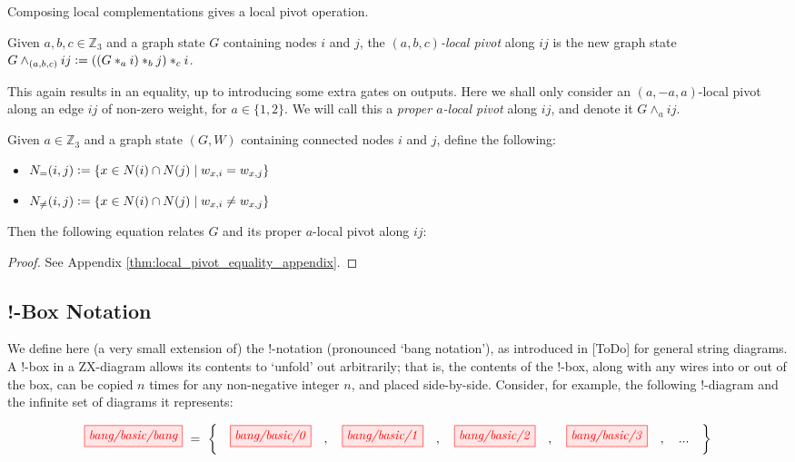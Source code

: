 Composing local complementations gives a local pivot operation.

\begin{definition}\label{def:local_pivot_qutrit}
	Given $a,b,c \in \mathbb{Z}_3$ and a graph state $G$ containing nodes $i$ and $j$, the \textit{$(a,b,c)$-local pivot} along $ij$ is the new graph state $G \wedge_{(a,b,c)} ij \vcentcolon= ((G *_a i) *_b j) *_c i$. 
\end{definition}

This again results in an equality, up to introducing some extra gates on outputs. Here we shall only consider an $(a,-a,a)$-local pivot along an edge $ij$ of non-zero weight, for $a \in \{1, 2\}$. We will call this a \textit{proper $a$-local pivot} along $ij$, and denote it $G \wedge_a ij$.

\begin{theorem}\label{thm:local_pivot_equality}
	Given $a \in \mathbb{Z}_3$ and a graph state $(G, W)$ containing connected nodes $i$ and $j$, define the following:
	\begin{itemize}
		\item $N_{=}(i, j) \vcentcolon= \left\{x \in N(i) \cap N(j) \mid w_{x,i} = w_{x,j} \right\}$
		\item $N_{\neq}(i, j) \vcentcolon= \left\{x \in N(i) \cap N(j) \mid w_{x,i} \neq w_{x,j} \right\}$
	\end{itemize} 
	Then the following equation relates $G$ and its proper $a$-local pivot along $ij$:

	\begin{proof}
		See Appendix \ref{thm:local_pivot_equality_appendix}.
	\end{proof}
\end{theorem}

\subsection{!-Box Notation}

We define here (a very small extension of) the !-notation (pronounced `bang notation'), as introduced in [ToDo] for general string diagrams. A !-box in a ZX-diagram allows its contents to `unfold' out arbitrarily; that is, the contents of the !-box, along with any wires into or out of the box, can be copied $n$ times for any non-negative integer $n$, and placed side-by-side. Consider, for example, the following !-diagram and the infinite set of diagrams it represents:

\begin{equation*}
	\tikzfig{bang/basic/bang} \ = \ \left\{ \quad
		\tikzfig{bang/basic/0} \quad , \quad
		\tikzfig{bang/basic/1} \quad , \quad 
		\tikzfig{bang/basic/2} \quad , \quad 
		\tikzfig{bang/basic/3} \quad , \quad
		... \quad
	\right\}
\end{equation*}

